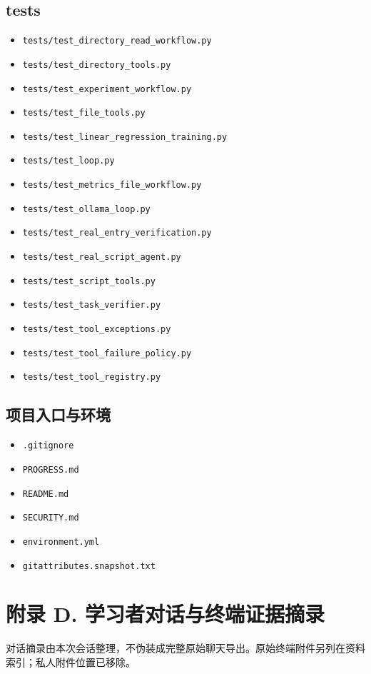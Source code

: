 \documentclass[UTF8,zihao=-4,fontset=fandol]{ctexart}
\begin{document}
\subsection{tests}
\begin{itemize}
\item \nolinkurl{tests/test_directory_read_workflow.py}
\item \nolinkurl{tests/test_directory_tools.py}
\item \nolinkurl{tests/test_experiment_workflow.py}
\item \nolinkurl{tests/test_file_tools.py}
\item \nolinkurl{tests/test_linear_regression_training.py}
\item \nolinkurl{tests/test_loop.py}
\item \nolinkurl{tests/test_metrics_file_workflow.py}
\item \nolinkurl{tests/test_ollama_loop.py}
\item \nolinkurl{tests/test_real_entry_verification.py}
\item \nolinkurl{tests/test_real_script_agent.py}
\item \nolinkurl{tests/test_script_tools.py}
\item \nolinkurl{tests/test_task_verifier.py}
\item \nolinkurl{tests/test_tool_exceptions.py}
\item \nolinkurl{tests/test_tool_failure_policy.py}
\item \nolinkurl{tests/test_tool_registry.py}
\end{itemize}

\subsection{项目入口与环境}
\begin{itemize}
\item \nolinkurl{.gitignore}
\item \nolinkurl{PROGRESS.md}
\item \nolinkurl{README.md}
\item \nolinkurl{SECURITY.md}
\item \nolinkurl{environment.yml}
\item \nolinkurl{gitattributes.snapshot.txt}
\end{itemize}

\section{附录 D. 学习者对话与终端证据摘录}
对话摘录由本次会话整理，不伪装成完整原始聊天导出。原始终端附件另列在资料索引；私人附件位置已移除。
\end{document}
